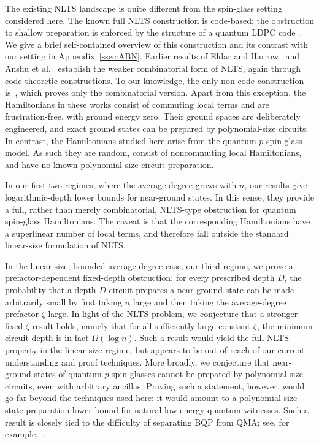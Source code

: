 \documentclass[12pt]{article}
\begin{document}
The existing NLTS landscape is quite different from the spin-glass setting considered here. The known full NLTS construction is code-based: the obstruction to shallow preparation is enforced by the structure of a quantum LDPC code~\cite{anshu2023nlts}. We give a brief self-contained overview of this construction and its contrast with our setting in
Appendix~\ref{ssec:ABN}. Earlier results of Eldar and Harrow~\cite{eldar2017local} and Anshu et al.~\cite{anshu2022construction}
establish the weaker combinatorial form of NLTS, again through code-theoretic
constructions. To our knowledge, the only non-code construction is~\cite{anschuetz2024combinatorial}, which proves only the combinatorial
version. Apart from this exception, the Hamiltonians in these works consist of
commuting local terms and are frustration-free, with ground energy zero. Their ground spaces are deliberately engineered, and exact ground states can be prepared by polynomial-size circuits.  In contrast, the Hamiltonians studied here arise from the quantum $p$-spin glass model. As such they  are random,
consist of  noncommuting local Hamiltonians, and have no known polynomial-size circuit preparation.

In our first two regimes, where the average degree grows with $n$, our results give logarithmic-depth lower bounds for near-ground states. In this sense, they provide a full, rather than merely combinatorial, NLTS-type obstruction for quantum spin-glass Hamiltonians. The caveat is that the corresponding Hamiltonians have a superlinear number of local terms, and
therefore fall outside the standard linear-size formulation of NLTS. 

In the linear-size, bounded-average-degree case, our third regime, we prove a prefactor-dependent fixed-depth obstruction: for every prescribed depth $D$, the probability that a depth-$D$ circuit prepares a near-ground state can be made arbitrarily small by first taking $n$ large and then taking the average-degree prefactor $\zeta$ large. In light of the NLTS problem, we conjecture that a stronger fixed-$\zeta$ result holds, namely that for all sufficiently large constant $\zeta$, the minimum circuit depth is in fact $\Omega(\log n)$. Such a result would yield the full NLTS property
in the linear-size regime, but appears to be out of reach of our current understanding and proof techniques.  More broadly, we conjecture that near-ground states of quantum $p$-spin glasses cannot be prepared by polynomial-size circuits, even with arbitrary ancillas. Proving such a statement, however, would go far beyond the techniques used here: it would amount to a polynomial-size state-preparation lower bound for natural low-energy quantum witnesses. Such a result is closely tied to the difficulty of separating $\mathrm{BQP}$ from $\mathrm{QMA}$; see, for example,~\cite{nielsen2010quantum}.
\end{document}
